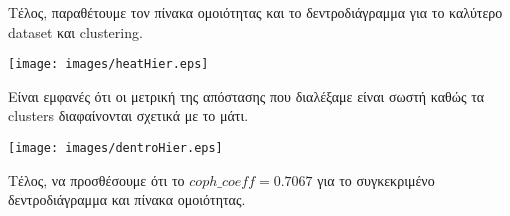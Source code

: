 Τέλος, παραθέτουμε τον πίνακα ομοιότητας και το δεντροδιάγραμμα για το καλύτερο dataset και clustering.

\noindent\begin{minipage}{\linewidth}
    \centering
    \texttt{[image: images/heatHier.eps]}
    \label{fig:Heat}
\end{minipage}

Είναι εμφανές ότι οι μετρική της απόστασης που διαλέξαμε είναι σωστή
καθώς τα clusters διαφαίνονται σχετικά με το μάτι.

\noindent\begin{minipage}{\linewidth}
    \centering
    \texttt{[image: images/dentroHier.eps]}
    \label{fig:Dentro}
\end{minipage}

Τέλος, να προσθέσουμε ότι το $coph\_coeff = 0.7067$ για το συγκεκριμένο δεντροδιάγραμμα και πίνακα ομοιότητας.
